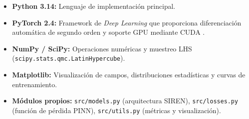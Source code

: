 \begin{itemize}
    \item \textbf{Python 3.14:} Lenguaje de implementación principal.
    \item \textbf{PyTorch 2.4:} Framework de \textit{Deep Learning} que
    proporciona diferenciación automática de segundo orden y soporte GPU
    mediante CUDA \parencite{raissi2019physics}.
    \item \textbf{NumPy / SciPy:} Operaciones numéricas y muestreo LHS
    (\texttt{scipy.stats.qmc.LatinHypercube}).
    \item \textbf{Matplotlib:} Visualización de campos, distribuciones
    estadísticas y curvas de entrenamiento.
    \item \textbf{Módulos propios:} \texttt{src/models.py} (arquitectura SIREN),
    \texttt{src/losses.py} (función de pérdida PINN), \texttt{src/utils.py}
    (métricas y visualización).
\end{itemize}
